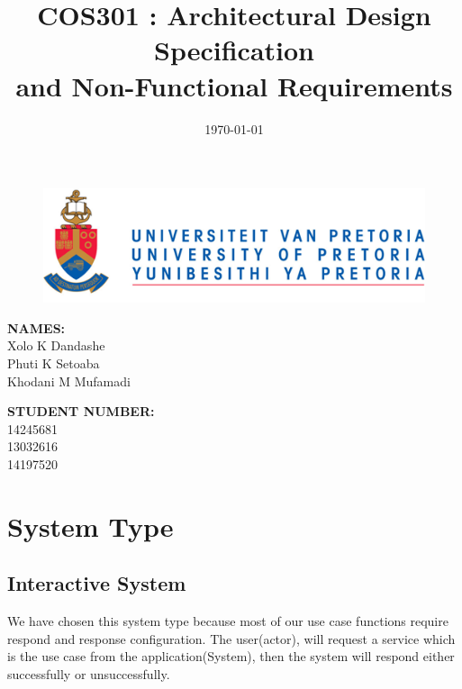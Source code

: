 \documentclass[english]{article}
\title{COS301 : Architectural Design Specification \\and Non-Functional Requirements}
\date{\today}
\begin{document}
	\maketitle
	\begin{figure}[!t]
		\includegraphics{up_logo.png}
	\end{figure}
	\begin{minipage}{0.4\textwidth}
		\begin{flushleft} \large
			\textbf{NAMES:}\\[0.4cm]
			Xolo K Dandashe\\
			Phuti K Setoaba\\
			Khodani M Mufamadi

		\end{flushleft}
	\end{minipage}
	\begin{minipage}{0.4\textwidth}
		\begin{flushright} \large
			\textbf{STUDENT NUMBER:} \\[0.4cm]
		 	14245681\\ 	
		 	13032616\\					
		 	14197520
		\end{flushright}
	\end{minipage}


	
	\newpage

	\tableofcontents
	
	\newpage
	\section{System Type} 
	\subsection{Interactive System}
		We have chosen this system type because most of our use case functions require respond and response configuration. The user(actor), will request a service which is the use case from the application(System), then the system will respond either successfully or unsuccessfully.
		
\end{document}
